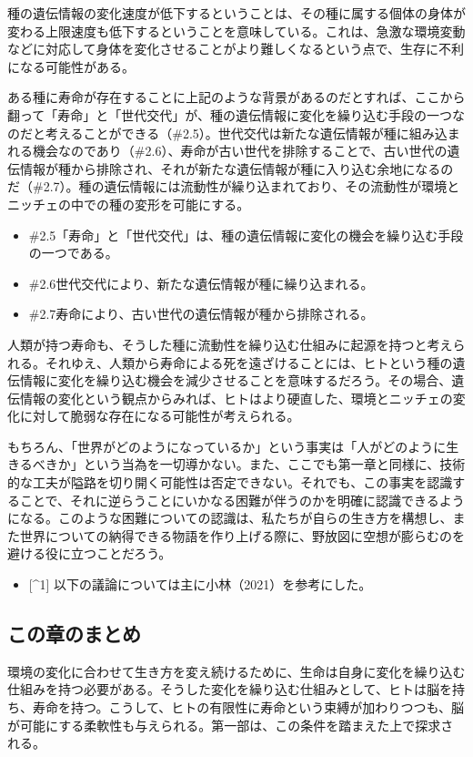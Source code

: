 種の遺伝情報の変化速度が低下するということは、その種に属する個体の身体が変わる上限速度も低下するということを意味している。これは、急激な環境変動などに対応して身体を変化させることがより難しくなるという点で、生存に不利になる可能性がある。

ある種に寿命が存在することに上記のような背景があるのだとすれば、ここから翻って「寿命」と「世代交代」が、種の遺伝情報に変化を繰り込む手段の一つなのだと考えることができる（\#2.5）。世代交代は新たな遺伝情報が種に組み込まれる機会なのであり（\#2.6）、寿命が古い世代を排除することで、古い世代の遺伝情報が種から排除され、それが新たな遺伝情報が種に入り込む余地になるのだ（\#2.7）。種の遺伝情報には流動性が繰り込まれており、その流動性が環境とニッチェの中での種の変形を可能にする。

\begin{note}{}
  \begin{itemize}
    \tightlist
    \item{\#2.5}「寿命」と「世代交代」は、種の遺伝情報に変化の機会を繰り込む手段の一つである。
    \item{\#2.6}世代交代により、新たな遺伝情報が種に繰り込まれる。
    \item{\#2.7}寿命により、古い世代の遺伝情報が種から排除される。
  \end{itemize}
\end{note}

人類が持つ寿命も、そうした種に流動性を繰り込む仕組みに起源を持つと考えられる。それゆえ、人類から寿命による死を遠ざけることには、ヒトという種の遺伝情報に変化を繰り込む機会を減少させることを意味するだろう。その場合、遺伝情報の変化という観点からみれば、ヒトはより硬直した、環境とニッチェの変化に対して脆弱な存在になる可能性が考えられる。

もちろん、「世界がどのようになっているか」という事実は「人がどのように生きるべきか」という当為を一切導かない。また、ここでも第一章と同様に、技術的な工夫が隘路を切り開く可能性は否定できない。それでも、この事実を認識することで、それに逆らうことにいかなる困難が伴うのかを明確に認識できるようになる。このような困難についての認識は、私たちが自らの生き方を構想し、また世界についての納得できる物語を作り上げる際に、野放図に空想が膨らむのを避ける役に立つことだろう。

\begin{itemize}
\tightlist
\item
  {[}\^{}1{]} 以下の議論については主に小林（2021）を参考にした。
\end{itemize}

\subsection{この章のまとめ}\label{ux3053ux306eux7ae0ux306eux307eux3068ux3081}

環境の変化に合わせて生き方を変え続けるために、生命は自身に変化を繰り込む仕組みを持つ必要がある。そうした変化を繰り込む仕組みとして、ヒトは脳を持ち、寿命を持つ。こうして、ヒトの有限性に寿命という束縛が加わりつつも、脳が可能にする柔軟性も与えられる。第一部は、この条件を踏まえた上で探求される。
